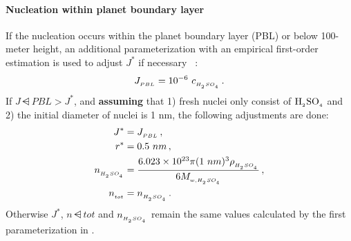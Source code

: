 \paragraph{Nucleation within planet boundary layer} 
If the nucleation occurs within the planet boundary layer (PBL) or below
100-meter height, an additional parameterization with an empirical
first-order estimation is used to adjust $J^*$ if necessary
~\cite{sihto-2006-acp,wang-2009-acp}:
\begin{equation}
J_{_{PBL}} = 10^{-6}~c_{_{H_{_2}SO_{_4}}} \,.
\end{equation}
If $J\dsub{PBL} > J^*$, and \textbf{assuming} that
1) fresh nuclei only consist of $\rm H_{_2}SO_{_4}$ and
2) the initial diameter of nuclei is 1 nm,
the following adjustments are done:
\begin{align}
J^* &= J_{_{PBL}} \,, \\
r^* &= 0.5~nm \,, \\
n_{_{H_{_2}SO_{_4}}} &= \frac{6.023 \times 10^{23} \pi (1~nm)^3
                           \rho_{_{H_{_2}SO_{_4}}}}{6 M_{_{w,H_{_2}SO_{_4}}}} \,, \\
n_{_{tot}} &= n_{_{H_{_2}SO_{_4}}} \,.
\end{align}
Otherwise $J^*$, $n\dsub{tot}$ and $n_{_{H_{_2}SO_{_4}}}$ remain the same values
calculated by the first parameterization in .

